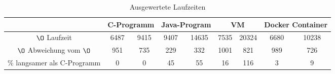 \begin{table}[]
	\begin{tabular}{c|c|c|c|c|c|c|c|c|}
		& \multicolumn{2}{c|}{C-Programm} & \multicolumn{2}{c|}{Java-Program} & \multicolumn{2}{c|}{VM} & \multicolumn{2}{c|}{Docker Container} \\ \hline
		$\O$ Laufzeit               & 6487           & 9415           & 9407            & 14635           & 7535       & 20324      & 6680              & 10238             \\ \hline
		$\O$ Abweichung vom $\O$    & 951            & 735            & 229             & 332             & 1001       & 821        & 989               & 726               \\ \hline
		\% langsamer als C-Programm & 0              & 0              & 45              & 55              & 16         & 116         & 3                 & 9                
	\end{tabular}
	\caption{Ausgewertete Laufzeiten}
	\label{vals}
\end{table}